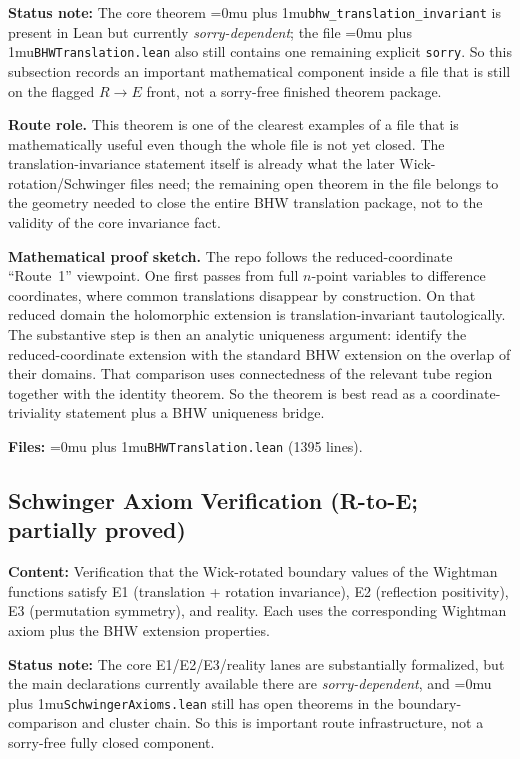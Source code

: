 \documentclass[11pt,a4paper]{article}
\newcommand{\sorry}{\texttt{sorry}}
\newcommand{\leanfile}[1]{\begingroup\Urlmuskip=0mu plus 1mu\relax\nolinkurl{#1}\endgroup}
\newcommand{\leanname}[1]{\begingroup\Urlmuskip=0mu plus 1mu\relax\nolinkurl{#1}\endgroup}
\begin{document}
\textbf{Status note:} The core theorem
\leanname{bhw\_translation\_invariant} is present in Lean but currently
\emph{sorry-dependent}; the file \leanfile{BHWTranslation.lean} also still contains
one remaining explicit \sorry{}. So this subsection records an important
mathematical component inside a file that is still on the flagged $R \to E$
front, not a sorry-free finished theorem package.

\medskip\noindent
\textbf{Route role.}
This theorem is one of the clearest examples of a file that is mathematically
useful even though the whole file is not yet closed. The translation-invariance
statement itself is already what the later Wick-rotation/Schwinger files need; the
remaining open theorem in the file belongs to the geometry needed to close the
entire BHW translation package, not to the validity of the core invariance fact.

\medskip\noindent
\textbf{Mathematical proof sketch.}
The repo follows the reduced-coordinate ``Route~1'' viewpoint. One first passes
from full $n$-point variables to difference coordinates, where common
translations disappear by construction. On that reduced domain the holomorphic
extension is translation-invariant tautologically. The substantive step is then
an analytic uniqueness argument: identify the reduced-coordinate extension with
the standard BHW extension on the overlap of their domains. That comparison uses
connectedness of the relevant tube region together with the identity theorem.
So the theorem is best read as a coordinate-triviality statement plus a BHW
uniqueness bridge.

\textbf{Files:} \leanname{BHWTranslation.lean} (1395 lines).

\subsection{Schwinger Axiom Verification (R-to-E; partially proved)}

\textbf{Content:} Verification that the Wick-rotated boundary values
of the Wightman functions satisfy E1 (translation + rotation invariance),
E2 (reflection positivity), E3 (permutation symmetry), and reality.
Each uses the corresponding Wightman axiom plus the BHW extension properties.

\textbf{Status note:} The core E1/E2/E3/reality lanes are substantially
formalized, but the main declarations currently available there are
\emph{sorry-dependent}, and \leanfile{SchwingerAxioms.lean} still has open theorems
in the boundary-comparison and cluster chain. So this is important route
infrastructure, not a sorry-free fully closed component.
\end{document}
